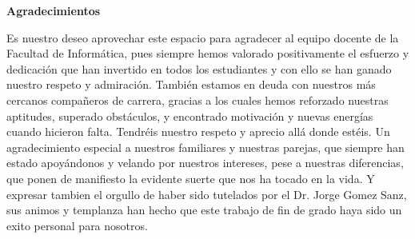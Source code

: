 
\newpage
\begin{center}
{\bf \Huge Agradecimientos}
\end{center}
\vspace{1cm}
\setlength{\baselineskip}{0.8cm}



Es nuestro deseo aprovechar este espacio para agradecer al equipo docente de la Facultad de Informática, pues siempre hemos valorado positivamente el esfuerzo y dedicación que han invertido en todos los estudiantes y con ello se han ganado nuestro respeto y admiración. También estamos en deuda con nuestros más cercanos compañeros de carrera, gracias a los cuales hemos reforzado nuestras aptitudes, superado obstáculos, y encontrado motivación y nuevas energías cuando hicieron falta. Tendréis nuestro respeto y aprecio allá donde estéis. Un agradecimiento especial a nuestros familiares y nuestras parejas, que siempre han estado apoyándonos y velando por nuestros intereses, pese a nuestras diferencias, que ponen de manifiesto la evidente suerte que nos ha tocado en la vida. Y expresar tambien el orgullo de haber sido tutelados por el Dr. Jorge Gomez Sanz, sus animos y templanza han hecho que este trabajo de fin de grado haya sido un exito personal para nosotros.
